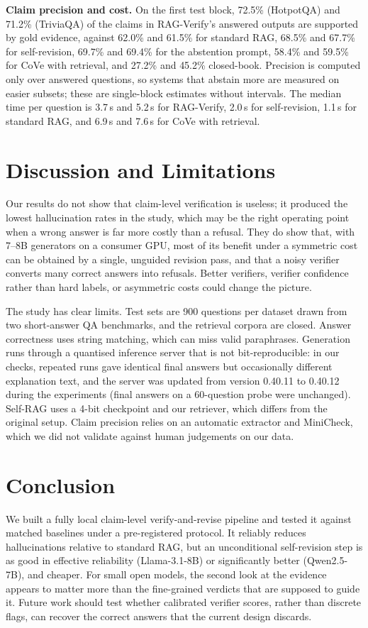 \documentclass[conference]{IEEEtran}
\begin{document}
\textbf{Claim precision and cost.} On the first test block, 72.5\% (HotpotQA) and 71.2\% (TriviaQA) of the claims in RAG-Verify's answered outputs are supported by gold evidence, against 62.0\% and 61.5\% for standard RAG, 68.5\% and 67.7\% for self-revision, 69.7\% and 69.4\% for the abstention prompt, 58.4\% and 59.5\% for CoVe with retrieval, and 27.2\% and 45.2\% closed-book. Precision is computed only over answered questions, so systems that abstain more are measured on easier subsets; these are single-block estimates without intervals. The median time per question is 3.7\,s and 5.2\,s for RAG-Verify, 2.0\,s for self-revision, 1.1\,s for standard RAG, and 6.9\,s and 7.6\,s for CoVe with retrieval.

\section{Discussion and Limitations}
Our results do not show that claim-level verification is useless; it produced the lowest hallucination rates in the study, which may be the right operating point when a wrong answer is far more costly than a refusal. They do show that, with 7--8B generators on a consumer GPU, most of its benefit under a symmetric cost can be obtained by a single, unguided revision pass, and that a noisy verifier converts many correct answers into refusals. Better verifiers, verifier confidence rather than hard labels, or asymmetric costs could change the picture.

The study has clear limits. Test sets are 900 questions per dataset drawn from two short-answer QA benchmarks, and the retrieval corpora are closed. Answer correctness uses string matching, which can miss valid paraphrases. Generation runs through a quantised inference server that is not bit-reproducible: in our checks, repeated runs gave identical final answers but occasionally different explanation text, and the server was updated from version 0.40.11 to 0.40.12 during the experiments (final answers on a 60-question probe were unchanged). Self-RAG uses a 4-bit checkpoint and our retriever, which differs from the original setup. Claim precision relies on an automatic extractor and MiniCheck, which we did not validate against human judgements on our data.

\section{Conclusion}
We built a fully local claim-level verify-and-revise pipeline and tested it against matched baselines under a pre-registered protocol. It reliably reduces hallucinations relative to standard RAG, but an unconditional self-revision step is as good in effective reliability (Llama-3.1-8B) or significantly better (Qwen2.5-7B), and cheaper. For small open models, the second look at the evidence appears to matter more than the fine-grained verdicts that are supposed to guide it. Future work should test whether calibrated verifier scores, rather than discrete flags, can recover the correct answers that the current design discards.
\end{document}
